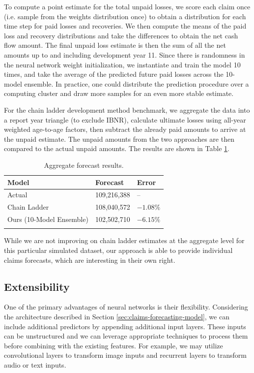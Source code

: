 \documentclass{article}
\begin{document}
To compute a point estimate for the total unpaid losses, we score each claim once (i.e. sample from the weights distribution once) to obtain a distribution for each time step for paid losses and recoveries. We then compute the means of the paid loss and recovery distributions and take the differences to obtain the net cash flow amount. The final unpaid loss estimate is then the sum of all the net amounts up to and including development year 11. Since there is randomness in the neural network weight initialization, we instantiate and train the model 10 times, and take the average of the predicted future paid losses across the 10-model ensemble. In practice, one could distribute the prediction procedure over a computing cluster and draw more samples for an even more stable estimate.

For the chain ladder development method benchmark, we aggregate the data into a report year triangle (to exclude IBNR), calculate ultimate losses using all-year weighted age-to-age factors, then subtract the already paid amounts to arrive at the unpaid estimate. The unpaid amounts from the two approaches are then compared to the actual unpaid amounts. The results are shown in Table \ref{table:results}.

\begin{table}[ht]
\centering
\begin{tabular}[t]{lll}
\toprule
Model & Forecast & Error\\
\midrule
Actual                                & 109,216,388  & --\\
Chain Ladder                          & 108,040,572  & $-1.08\%$\\
Ours (10-Model Ensemble)              & 102,502,710  & $-6.15\%$\\
\bottomrule\\[1ex]
\end{tabular}
\caption{Aggregate forecast results.}
\label{table:results}
\end{table}%

While we are not improving on chain ladder estimates at the aggregate level for this particular simulated dataset, our approach is able to provide individual claims forecasts, which are interesting in their own right.

\subsection{Extensibility}

One of the primary advantages of neural networks is their flexibility. Considering the architecture described in Section \ref{sec:claims-forecasting-model}, we can include additional predictors by appending additional input layers. These inputs can be unstructured and we can leverage appropriate techniques to process them before combining with the existing features. For example, we may utilize convolutional layers to transform image inputs and recurrent layers to transform audio or text inputs.
\end{document}
